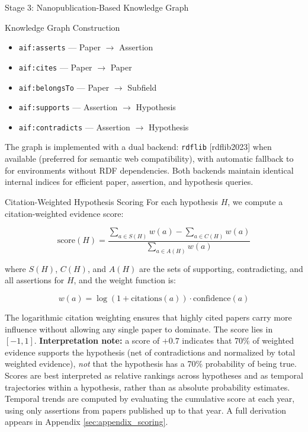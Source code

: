 \documentclass[
  ignorenonframetext,
]{beamer}
\providecommand{\tightlist}{%
  \setlength{\itemsep}{0pt}\setlength{\parskip}{0pt}}
\providecommand{\citep}[1]{[#1]}
\begin{document}
\begin{frame}{Stage 3: Nanopublication-Based
Knowledge Graph \label{sec:methods_kg}}
\begin{block}{Knowledge Graph Construction}
\begin{itemize}
\tightlist
\item
  \texttt{aif:asserts} --- Paper \(\to\) Assertion
\item
  \texttt{aif:cites} --- Paper \(\to\) Paper
\item
  \texttt{aif:belongsTo} --- Paper \(\to\) Subfield
\item
  \texttt{aif:supports} --- Assertion \(\to\) Hypothesis
\item
  \texttt{aif:contradicts} --- Assertion \(\to\) Hypothesis
\end{itemize}

The graph is implemented with a dual backend: \texttt{rdflib}
\citep{rdflib2023} when available (preferred for semantic web
compatibility), with automatic fallback to  for
environments without RDF dependencies. Both backends maintain identical
internal indices for efficient paper, assertion, and hypothesis queries.
\end{block}

\begin{block}{Citation-Weighted Hypothesis Scoring}
\protect{}\label{citation-weighted-hypothesis-scoring}
For each hypothesis \(H\), we compute a citation-weighted evidence
score:

\begin{equation}
\text{score}(H) = \frac{\sum_{a \in S(H)} w(a) - \sum_{a \in C(H)} w(a)}{\sum_{a \in A(H)} w(a)} \label{eq:score}
\end{equation}

where \(S(H)\), \(C(H)\), and \(A(H)\) are the sets of supporting,
contradicting, and all assertions for \(H\), and the weight function is:

\begin{equation}
w(a) = \log(1 + \text{citations}(a)) \cdot \text{confidence}(a) \label{eq:weight}
\end{equation}

The logarithmic citation weighting ensures that highly cited papers
carry more influence without allowing any single paper to dominate. The
score lies in \([-1, 1]\). \textbf{Interpretation note:} a score of
\(+0.7\) indicates that 70\% of weighted evidence supports the
hypothesis (net of contradictions and normalized by total weighted
evidence), \emph{not} that the hypothesis has a 70\% probability of
being true. Scores are best interpreted as relative rankings across
hypotheses and as temporal trajectories within a hypothesis, rather than
as absolute probability estimates. Temporal trends are computed by
evaluating the cumulative score at each year, using only assertions from
papers published up to that year. A full derivation appears in Appendix
\ref{sec:appendix_scoring}.
\end{block}


\end{frame}
\end{document}

